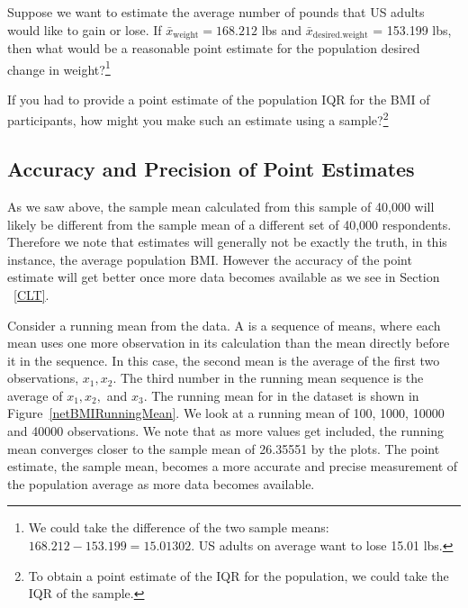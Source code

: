 \begin{exercise} \label{pointEstimateOfDesiredWeights}
Suppose we want to estimate the average number of pounds that US adults would like to gain or lose. If $\bar{x}_\mathrm{{weight}}=168.212$ lbs and $\bar{x}_\textrm{{desired.weight}}$ = 153.199 lbs, then what would be a reasonable point estimate for the population desired change in weight?\footnote{We could take the difference of the two sample means: $168.212- 153.199=  15.01302$. US adults on average want to lose 15.01 lbs.}
\end{exercise}

\begin{exercise}
If you had to provide a point estimate of the population IQR for the BMI of participants, how might you make such an estimate using a sample?\footnote{To obtain a point estimate of the IQR for the population, we could take the IQR of the sample.}


\end{exercise}

\subsection{Accuracy and Precision of Point Estimates}

As we saw above, the sample mean calculated from this sample of 40,000 will likely be different from the sample mean of a different set of 40,000 respondents. Therefore we note that estimates will generally not be exactly the truth, in this instance, the average population BMI. However the accuracy of the point estimate will get better once more data becomes available as we see in Section ~\ref{CLT}. 

Consider a running mean from the  data. A  is a sequence of means, where each mean uses one more observation in its calculation than the mean directly before it in the sequence. In this case, the second mean is the average of the first two observations, $x_1, x_2$. The third number in the running mean sequence is the average of $x_1, x_2,$ and $x_3$. The running mean for  in the  dataset is shown in Figure~\ref{netBMIRunningMean}. We look at a running mean of 100, 1000, 10000 and 40000 observations. We note that as more values get included, the running mean converges closer to the sample mean of 26.35551 by the plots. The point estimate, the sample mean, becomes a more accurate and precise measurement of the population average as more data becomes available. 

